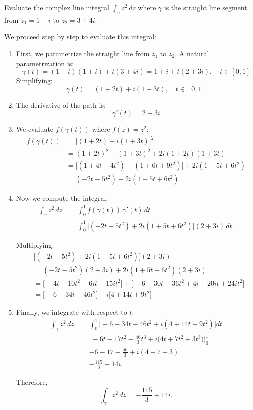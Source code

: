 \exampleline
\begin{example}
Evaluate the complex line integral $\displaystyle\int_{\gamma} z^2 \, dz$ where $\gamma$ is the straight line segment from $z_1 = 1+i$ to $z_2 = 3+4i$.

\begin{solution}
We proceed step by step to evaluate this integral:

\begin{enumerate}
\item First, we parametrize the straight line from $z_1$ to $z_2$. A natural parametrization is:
   \[
   \gamma(t) = (1-t)(1+i) + t(3+4i) = 1+i + t(2+3i), \quad t \in [0,1]
   \]
   Simplifying:
   \[
   \gamma(t) = (1+2t) + i(1+3t), \quad t \in [0,1]
   \]

\item The derivative of the path is:
   \[
   \gamma'(t) = 2 + 3i
   \]

\item We evaluate $f(\gamma(t))$ where $f(z) = z^2$:
   \begin{align*}
   f(\gamma(t)) &= \Big[(1+2t) + i(1+3t)\Big]^2 \\
   &= (1+2t)^2 - (1+3t)^2 + 2i(1+2t)(1+3t) \\
   &= \Big[(1+4t+4t^2) - (1+6t+9t^2)\Big] + 2i(1+5t+6t^2) \\
   &= (-2t-5t^2) + 2i(1+5t+6t^2)
   \end{align*}

\item Now we compute the integral:
   \begin{align*}
   \int_{\gamma} z^2 \, dz &= \int_0^1 f(\gamma(t))\, \gamma'(t)\, dt \\
   &= \int_0^1 \Big[(-2t-5t^2) + 2i(1+5t+6t^2)\Big](2+3i)\, dt.
   \end{align*}
   
   Multiplying:
   \begin{align*}
   &\Big[(-2t-5t^2) + 2i(1+5t+6t^2)\Big](2+3i) \\
   &= (-2t-5t^2)(2+3i) + 2i(1+5t+6t^2)(2+3i) \\
   &= \Big[-4t-10t^2 - 6it-15it^2\Big] + \Big[-6-30t-36t^2 + 4i+20it+24it^2\Big] \\
   &= \Big[-6 - 34t - 46t^2\Big] + i\Big[4 + 14t + 9t^2\Big]
   \end{align*}

\item Finally, we integrate with respect to $t$:
   \begin{align*}
   \int_{\gamma} z^2 \, dz &= \int_0^1 \Big[-6 - 34t - 46t^2 + i(4 + 14t + 9t^2)\Big] dt \\
   &= \Big[-6t - 17t^2 - \frac{46}{3}t^3 + i\Big(4t + 7t^2 + 3t^3\Big)\Big]_0^1 \\
   &= -6 - 17 - \frac{46}{3} + i(4+7+3) \\
   &= -\frac{115}{3} + 14i.
   \end{align*}

Therefore, 
\[
\displaystyle\int_{\gamma} z^2 \, dz = -\frac{115}{3} + 14i.
\]
\end{enumerate}
\end{solution}
\end{example}
\exampleline


